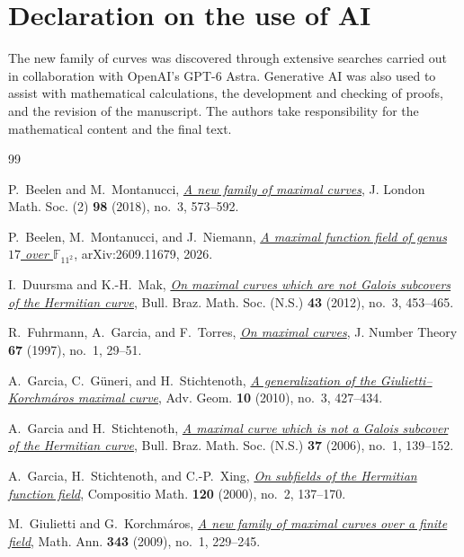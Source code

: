 \documentclass[12pt,reqno]{amsart}
\numberwithin{equation}{section}
\newcommand{\F}{\mathbb F}
\theoremstyle{plain}
\theoremstyle{definition}
\theoremstyle{remark}
\begin{document}
\section*{Declaration on the use of AI}

The new family of curves was discovered through extensive searches
carried out in collaboration with OpenAI's GPT-6 Astra.
Generative AI was also used to assist with mathematical calculations,
the development and checking of proofs, and the revision of the
manuscript. The authors take responsibility for the mathematical
content and the final text.


\begin{thebibliography}{99}

P.~Beelen and M.~Montanucci,
\href{https://doi.org/10.1112/jlms.12144}{\emph{A new family of maximal curves}},
J. London Math. Soc. (2) \textbf{98} (2018), no.~3, 573--592.

P.~Beelen, M.~Montanucci, and J.~Niemann,
\href{https://arxiv.org/abs/2609.11679}{\emph{A maximal function field of genus $17$ over $\F_{11^2}$}},
arXiv:2609.11679, 2026.

I.~Duursma and K.-H.~Mak,
\href{https://doi.org/10.1007/s00574-012-0022-2}{\emph{On maximal curves which are not Galois subcovers of the Hermitian curve}},
Bull. Braz. Math. Soc. (N.S.) \textbf{43} (2012), no.~3, 453--465.

R.~Fuhrmann, A.~Garcia, and F.~Torres,
\href{https://arxiv.org/abs/alg-geom/9610023}{\emph{On maximal curves}},
J. Number Theory \textbf{67} (1997), no.~1, 29--51.

A.~Garcia, C.~G\"uneri, and H.~Stichtenoth,
\href{https://doi.org/10.1515/ADVGEOM.2010.020}{\emph{A generalization of the Giulietti--Korchm\'aros maximal curve}},
Adv. Geom. \textbf{10} (2010), no.~3, 427--434.

A.~Garcia and H.~Stichtenoth,
\href{https://doi.org/10.1007/s00574-006-0008-z}{\emph{A maximal curve which is not a Galois subcover of the Hermitian curve}},
Bull. Braz. Math. Soc. (N.S.) \textbf{37} (2006), no.~1, 139--152.

A.~Garcia, H.~Stichtenoth, and C.-P.~Xing,
\href{https://doi.org/10.1023/A:1001736016924}{\emph{On subfields of the Hermitian function field}},
Compositio Math. \textbf{120} (2000), no.~2, 137--170.

M.~Giulietti and G.~Korchm\'aros,
\href{https://doi.org/10.1007/s00208-008-0270-z}{\emph{A new family of maximal curves over a finite field}},
Math. Ann. \textbf{343} (2009), no.~1, 229--245.


\end{thebibliography}
\end{document}
